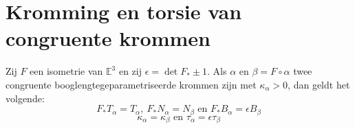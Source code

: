 \documentclass[main.tex]{subfiles}
\begin{document}
\section{Kromming en torsie van congruente krommen}
\label{sec:kromming-en-torsie-1}

\begin{st}
  Zij $F$ een isometrie van $\mathbb{E}^{3}$ en zij $\epsilon = \det F_{*} \pm 1$.
  Als $\alpha$ en $\beta = F \circ \alpha$ twee congruente booglengtegeparametriseerde krommen zijn met $\kappa_{\alpha} > 0$, dan geldt het volgende:
  \[ F_{*}T_{\alpha} = T_{\alpha},\ F_{*}N_{\alpha} = N_{\beta} \text{ en } F_{*}B_{\alpha}= \epsilon B_{\beta} \]
  \[ \kappa_{\alpha} = \kappa_{\beta} \text{ en } \tau_{\alpha} = \epsilon \tau_{\beta} \]
\end{st}
\end{document}
